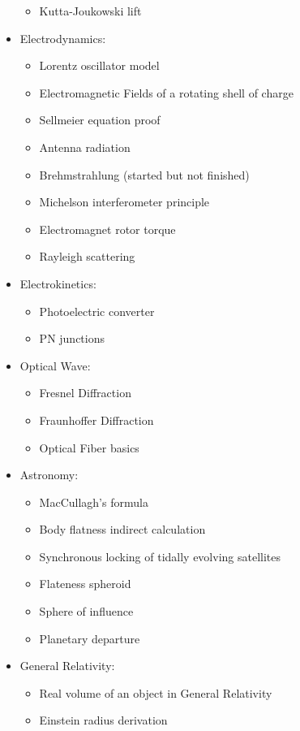 \begin{itemize}
\begin{itemize}
				\item Kutta-Joukowski lift
			\end{itemize}	
		\item Electrodynamics:
			\begin{itemize}		
				\item Lorentz oscillator model
				\item Electromagnetic Fields of a rotating shell of charge
				\item Sellmeier equation proof
				\item Antenna radiation
				\item Brehmstrahlung (started but not finished)
				\item Michelson interferometer principle
				\item Electromagnet rotor torque
				\item Rayleigh scattering
			\end{itemize}
		\item Electrokinetics:
			\begin{itemize}		
				\item Photoelectric converter
				\item PN junctions
			\end{itemize}
		\item Optical Wave:
			\begin{itemize}		
				\item Fresnel Diffraction
				\item Fraunhoffer Diffraction
				\item Optical Fiber basics
			\end{itemize}
		\item Astronomy:
			\begin{itemize}	
				\item MacCullagh's formula
				\item Body flatness indirect calculation
				\item Synchronous locking of tidally evolving satellites	
				\item Flateness spheroid
				\item Sphere of influence
				\item Planetary departure
			\end{itemize}		
		\item General Relativity:
			\begin{itemize}
				\item Real volume of an object in General Relativity
				\item Einstein radius derivation

\end{itemize}
\end{itemize}
